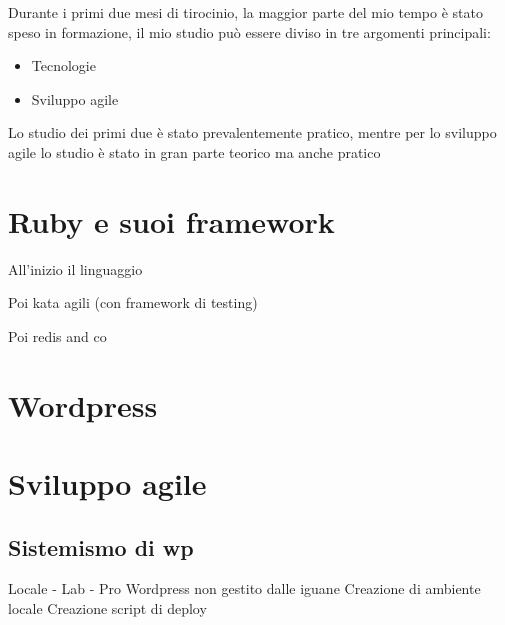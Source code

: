 


Durante i primi due mesi di tirocinio, la maggior parte del mio tempo è stato speso in formazione,
il mio studio può essere diviso in tre argomenti principali:

\begin{itemize}
\item Tecnologie
\item Sviluppo agile
\end{itemize}

Lo studio dei primi due è stato prevalentemente pratico, mentre per lo sviluppo
agile lo studio è stato in gran parte teorico ma anche pratico

\section{Ruby e suoi framework}

All'inizio il linguaggio

Poi kata agili (con framework di testing)

Poi redis and co


\section{Wordpress}

\section{Sviluppo agile}


\subsection {Sistemismo di wp}
Locale - Lab - Pro
Wordpress non gestito dalle iguane
Creazione di ambiente locale 
Creazione script di deploy



